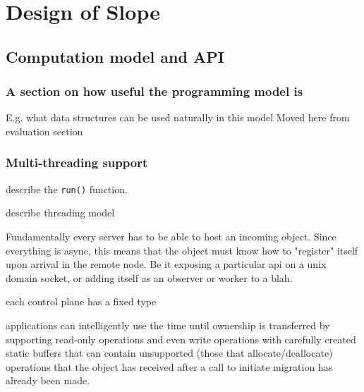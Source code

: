 \chapter{Design of Slope}
\label{chap:design}






\section{Computation model and API}
\subsection{A section on how useful the programming model is}
E.g. what data structures can be used naturally in this model
Moved here from evaluation section
\subsection{Multi-threading support}

describe the \texttt{run()} function.

describe threading model


Fundamentally every server has to be able to host an incoming object.
Since everything is async, this means that the object must know how to
"register" itself upon arrival in the remote node. Be it exposing a particular
api on a unix domain socket, or adding itself as an observer or worker to a blah.

each control plane has a fixed type

applications can intelligently use the time until ownership is transferred by
supporting read-only operations and even write operations with carefully
created static buffers that can contain unsupported (those that allocate/deallocate)
operations that the object has received after a call to initiate migration has
already been made.


